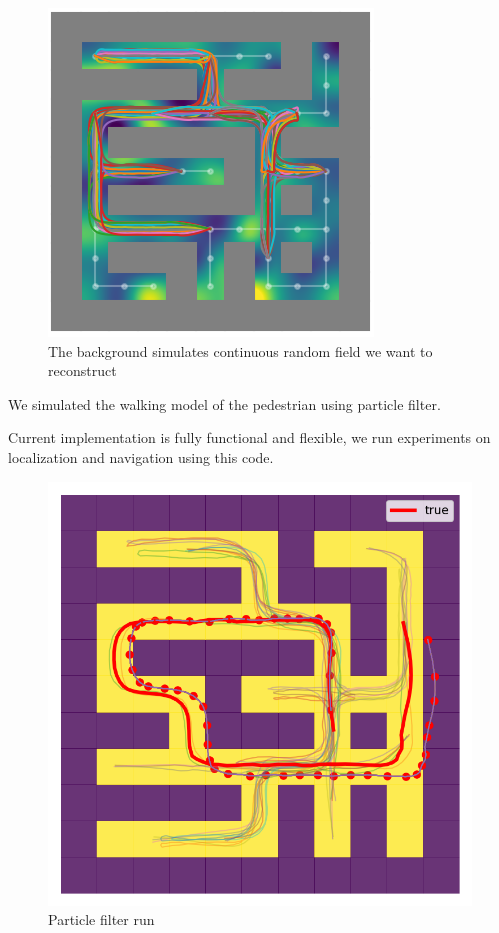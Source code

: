\documentclass[a4paper, 12pt]{article}
\begin{document}
\begin{figure}
	\centering
	\includegraphics[width=0.7\linewidth]{images/routes3}
	\caption{The background simulates continuous random field we want to reconstruct}
	\label{fig:routes3}
\end{figure}


We simulated the walking model of the pedestrian using particle filter.

Current implementation is fully functional and flexible,
we run experiments on localization and navigation using this code.


\begin{figure}
	\centering
	\includegraphics[width=0.7\linewidth]{images/Figure_dvwaerv1}
	\caption{Particle filter run}
	\label{fig:pf}
\end{figure}
\end{document}
